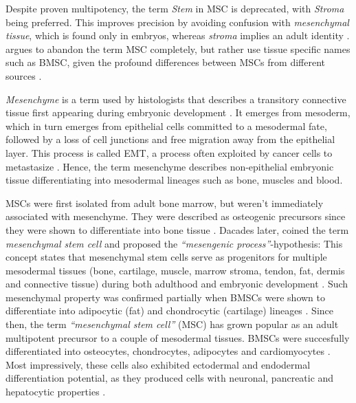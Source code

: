 Despite proven multipotency, the term \emph{Stem} in \ac{MSC} is deprecated,
with \emph{Stroma} being preferred. This improves precision by avoiding
confusion with \emph{mesenchymal tissue}, which is found only in embryos,
whereas \emph{stroma} implies an adult identity
\cite{robeyMesenchymalStemCells2017}. \citet{robeyMesenchymalStemCells2017}
argues to abandon the term MSC completely, but rather use tissue specific names
such as \ac{BMSC}, given the profound differences between MSCs from different
sources \cite{jansenFunctionalDifferencesMesenchymal2010,
    sacchettiNoIdenticalMesenchymal2016}.


\emph{Mesenchyme} is a term used by histologists that describes a transitory
connective tissue first appearing during embryonic development
\cite{robeyMesenchymalStemCells2017}. It emerges from mesoderm, which in turn
emerges from epithelial cells committed to a mesodermal fate, followed by a loss
of cell junctions and free migration away from the epithelial layer. This
process is called \acf{EMT}, a process often exploited by cancer cells to
metastasize \cite{tamFormationMesodermalTissues1987,
nowotschinCellularDynamicsEarly2010}. Hence, the term mesenchyme describes
non-epithelial embryonic tissue differentiating into mesodermal lineages such as
bone, muscles and blood.

\acp{MSC} were first isolated from adult bone marrow, but weren't immediately
associated with mesenchyme. They were described as osteogenic precursors since
they were shown to differentiate into bone tissue
\cite{friedensteinOsteogenesisTransplantsBone1966,
    friedensteinOsteogenicPrecursorCells1971, biancoMesenchymalStemCells2014}.
Dacades later, \citet{caplanMesenchymalStemCells1991} coined the term
\emph{mesenchymal stem cell} and proposed the \emph{``mesengenic
    process''}-hypothesis: This concept states that mesenchymal stem cells serve as
progenitors for multiple mesodermal tissues (bone, cartilage, muscle, marrow
stroma, tendon, fat, dermis and connective tissue) during both adulthood and
embryonic development \cite{caplanMesengenicProcess1994}. Such mesenchymal
property was confirmed partially when \acp{BMSC} were shown to differentiate
into adipocytic (fat) and chondrocytic (cartilage) lineages
\cite{pittengerMultilineagePotentialAdult1999}. Since then, the term
\emph{``mesenchymal stem cell''} (MSC) has grown popular as an adult multipotent
precursor to a couple of mesodermal tissues. \acp{BMSC} were succesfully
differentiated into osteocytes, chondrocytes, adipocytes and cardiomyocytes
\cite{gronthosSTRO1FractionAdult1994,
    muruganandanAdipocyteDifferentiationBone2009, xuMesenchymalStemCells2004}. Most
impressively, these cells also exhibited ectodermal and endodermal
differentiation potential, as they produced cells with neuronal, pancreatic and
hepatocytic properties \cite{barzilayLentiviralDeliveryLMX1a2009,
    wilkinsHumanBoneMarrowderived2009, gabrInsulinproducingCellsAdult2013,
    stockHumanBoneMarrow2014}.

